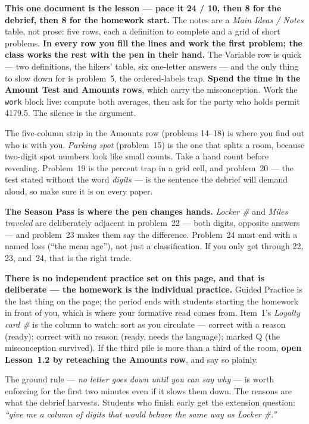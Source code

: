 \documentclass[10pt]{article}
\begin{document}
\begin{teachernote}
\textbf{This one document is the lesson --- pace it 24 / 10, then 8 for the debrief, then 8 for
the homework start.} The notes are a \emph{Main Ideas / Notes} table, not prose: five rows, each
a definition to complete and a grid of short problems. \textbf{In every row you fill the lines
and work the first problem; the class works the rest with the pen in their hand.} The Variable
row is quick --- two definitions, the hikers' table, six one-letter answers --- and the only
thing to slow down for is problem~5, the ordered-labels trap. \textbf{Spend the time in the
Amount Test and Amounts rows}, which carry the misconception. Work the \texttt{work} block
live: compute both averages, then ask for the party who holds permit 4179.5. The silence is the
argument.

The five-column strip in the Amounts row (problems 14--18) is where you find out who is with
you. \emph{Parking spot} (problem~15) is the one that splits a room, because two-digit spot
numbers look like small counts. Take a hand count before revealing. Problem~19 is the percent
trap in a grid cell, and problem~20 --- the test stated without the word \emph{digits} --- is
the sentence the debrief will demand aloud, so make sure it is on every paper.

\textbf{The Season Pass is where the pen changes hands.} \emph{Locker \#} and \emph{Miles
traveled} are deliberately adjacent in problem~22 --- both digits, opposite answers --- and
problem~23 makes them say the difference. Problem~24 must end with a named loss (``the mean
age''), not just a classification. If you only get through 22, 23, and~24, that is the right
trade.

\textbf{There is no independent practice set on this page, and that is deliberate --- the
homework is the individual practice.} Guided Practice is the last thing on the page; the period
ends with students starting the homework in front of you, which is where your formative read
comes from. Item~1's \emph{Loyalty card \#} is the column to watch: sort as you circulate ---
correct with a reason (ready); correct with no reason (ready, needs the language); marked Q (the
misconception survived). If the third pile is more than a third of the room, \textbf{open
Lesson~1.2 by reteaching the Amounts row}, and say so plainly.

The ground rule --- \emph{no letter goes down until you can say why} --- is worth enforcing for
the first two minutes even if it slows them down. The reasons are what the debrief harvests.
Students who finish early get the extension question: \emph{``give me a column of digits that
would behave the same way as Locker \#.''}


\end{teachernote}
\end{document}
